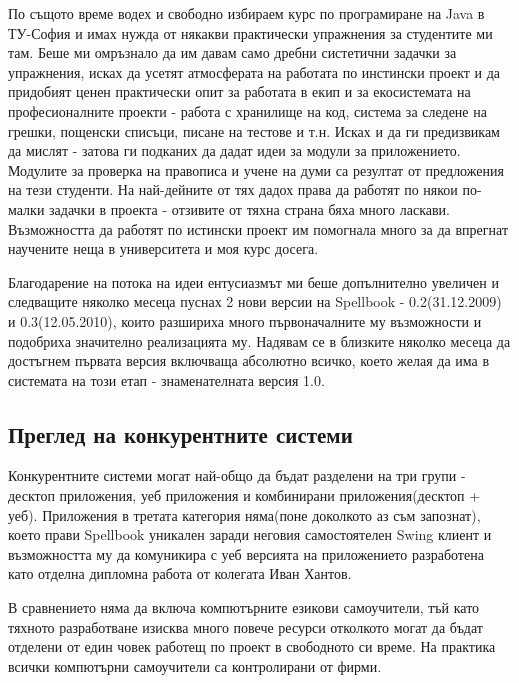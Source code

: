 По същото време водех и свободно избираем курс по програмиране на Java
в ТУ-София и имах нужда от някакви практически упражнения за
студентите ми там. Беше ми омръзнало да им давам само дребни
систетични задачки за упражнения, исках да усетят атмосферата на
работата по инстински проект и да придобият ценен практически опит за
работата в екип и за екосистемата на професионалните проекти - работа
с хранилище на код, система за следене на грешки, пощенски списъци,
писане на тестове и т.н. Исках и да ги предизвикам да мислят - затова
ги подканих да дадат идеи за модули за приложението. Модулите за
проверка на правописа и учене на думи са резултат от предложения на
тези студенти. На най-дейните от тях дадох права да работят по някои
по-малки задачки в проекта - отзивите от тяхна страна бяха много
ласкави. Възможността да работят по истински проект им помогнала много
за да впрегнат научените неща в университета и моя курс досега.

Благодарение на потока на идеи ентусиазмът ми беше допълнително
увеличен и следващите няколко месеца пуснах 2 нови версии на Spellbook
- 0.2(31.12.2009) и 0.3(12.05.2010), които разшириха много
първоначалните му възможности и подобриха значително реализацията
му. Надявам се в близките няколко месеца да достъгнем първата версия
включваща абсолютно всичко, което желая да има в системата на този
етап - знаменателната версия 1.0.
\subsection{Преглед на конкурентните системи}
Конкурентните системи могат най-общо да бъдат разделени на три групи -
десктоп приложения, уеб приложения и комбинирани приложения(десктоп +
уеб). Приложения в третата категория няма(поне доколкото аз съм
запознат), което прави Spellbook уникален заради неговия самостоятелен
Swing клиент и възможността му да комуникира с уеб версията на
приложението разработена като отделна дипломна работа от колегата Иван
Хантов. 

В сравнението няма да включа компютърните езикови самоучители, тъй
като тяхното разработване изисква много повече ресурси отколкото могат
да бъдат отделени от един човек работещ по проект в свободното си
време. На практика всички компютърни самоучители са контролирани от
фирми. 


